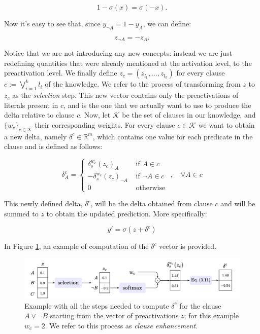 \begin{equation*}
1 - \sigma(x) = \sigma(-x).
\end{equation*}

Now it's easy to see that, since $y_{\neg A} = 1 - y_A$, we can define:

\begin{equation*}
z_{\neg A} = -z_A.
\end{equation*}

Notice that we are not introducing any new concepts: instead we are just redefining quantities that were already mentioned at the activation level, to the preactivation level. %
We finally define $z_c = \left(z_{l_1}, \dots, z_{l_k}\right)$ for every clause $c := \bigvee_{i=1}^k l_i$ of the knowledge. We refer to the process of transforming from $z$ to $z_c$ as the \textit{selection} step. This new vector contains only the preactivations of literals present in $c$, and is the one that we actually want to use to produce the delta relative to clause $c$. Now, let $\mathcal{K}$ be the set of clauses in our knowledge, and $\{w_c\}_{c\in\mathcal{K}}$ their corresponding weights. For every clause $c\in \mathcal{K}$ we want to obtain a new delta, namely $\delta^c \in \mathbb{R}^m$, which contains one value for each predicate in the clause and is defined as follows:

\begin{equation}
\delta_{A}^{c}= \begin{cases}\delta_{s}^{w_{c}}\left(z_{c}\right)_{A} & \text { if } A \in c \\ -\delta_{s}^{w_{c}}\left(z_{c}\right)_{\neg A} & \text { if } \neg A \in c \\ 0 & \text { otherwise }\end{cases}, \quad \forall A \in c
\label{eq:delta_c}
\end{equation}

This newly defined delta, $\delta^c$, will be the delta obtained from clause $c$ and will be summed to $z$ to obtain the updated prediction. More specifically:

$$y' = \sigma(z + \delta^c)$$

In Figure \ref{fig:delta_single_clause}, an example of computation of the $\delta^ c$ vector is provided.

\begin{figure}[h!]
	\centering
	\includegraphics[width=\linewidth]{figures/delta_single_clause.pdf}
	\caption{Example with all the steps needed to compute $\delta^c$ for the clause $A \vee \neg B$ starting from the vector of preactivations $z$; for this example $w_c=2$. We refer to this process as \textit{clause enhancement}.}
	\label{fig:delta_single_clause}
\end{figure}


